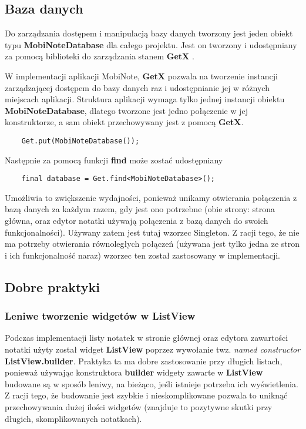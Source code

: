 \subsection{Baza danych}

Do zarządzania dostępem i manipulacją bazy danych tworzony jest jeden obiekt typu \textbf{MobiNoteDatabase} dla całego projektu. Jest on tworzony i udostępniany za pomocą biblioteki do zarządzania stanem \textbf{GetX} \cite{getx}. 

W implementacji aplikacji MobiNote, \textbf{GetX} pozwala na tworzenie instancji zarządzającej dostępem do bazy danych raz i udostępnianie jej w różnych miejscach aplikacji. Struktura aplikacji wymaga tylko jednej instancji obiektu \textbf{MobiNoteDatabase}, dlatego tworzone jest jedno połączenie w jej konstruktorze, a sam obiekt przechowywany jest z pomocą \textbf{GetX}.

\begin{verbatim}
    Get.put(MobiNoteDatabase());
\end{verbatim}

\noindent Następnie za pomocą funkcji \textbf{find} może zostać udostępniany

\begin{verbatim}
    final database = Get.find<MobiNoteDatabase>();
\end{verbatim}

Umożliwia to zwiększenie wydajności, ponieważ unikamy otwierania połączenia z bazą danych za każdym razem, gdy jest ono potrzebne (obie strony: strona główna, oraz edytor notatki używają połączenia z bazą danych do swoich funkcjonalności). Używany zatem jest tutaj wzorzec Singleton. Z racji tego, że nie ma potrzeby otwierania równoległych połączeń (używana jest tylko jedna ze stron i ich funkcjonalność naraz) wzorzec ten został zastosowany w implementacji.

\subsection{Dobre praktyki}

\subsubsection{Leniwe tworzenie widgetów w ListView}

Podczas implementacji listy notatek w stronie głównej oraz edytora zawartości notatki użyty został widget \textbf{ListView} poprzez wywołanie twz. \textit{named constructor} \textbf{ListView.builder}. Praktyka ta ma dobre zastosowanie przy długich listach, ponieważ używając konstruktora \textbf{builder} widgety zawarte w \textbf{ListView} budowane są w sposób leniwy, na bieżąco, jeśli istnieje potrzeba ich wyświetlenia. Z racji tego, że budowanie jest szybkie i nieskomplikowane pozwala to uniknąć przechowywania dużej ilości widgetów (znajduje to pozytywne skutki przy długich, skomplikowanych notatkach).

